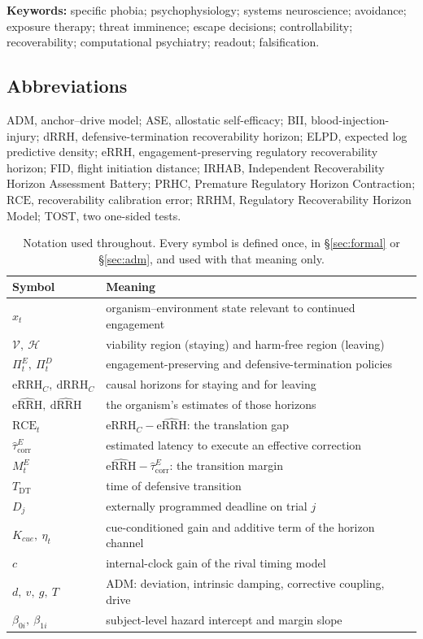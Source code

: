 \documentclass[9pt,twocolumn]{article}
\newcommand{\eRRH}{\mathrm{eRRH}}
\newcommand{\dRRH}{\mathrm{dRRH}}
\newcommand{\eRRHc}{\mathrm{eRRH}_{C}}
\newcommand{\dRRHc}{\mathrm{dRRH}_{C}}
\newcommand{\eRRHhat}{\widehat{\mathrm{eRRH}}}
\newcommand{\dRRHhat}{\widehat{\mathrm{dRRH}}}
\newcommand{\RCE}{\mathrm{RCE}}
\newcommand{\Tdt}{T_{\mathrm{DT}}}
\newcommand{\tcorr}{\widehat{\tau}^{E}_{\mathrm{corr}}}
\newcommand{\Vset}{\mathcal{V}}
\newcommand{\Hset}{\mathcal{H}}
\begin{document}
\noindent\textbf{Keywords:} specific phobia; psychophysiology; systems neuroscience; avoidance; exposure therapy; threat imminence; escape decisions; controllability; recoverability; computational psychiatry; readout; falsification.

\subsection*{Abbreviations}
\noindent\footnotesize
ADM, anchor--drive model; ASE, allostatic self-efficacy; BII, blood-injection-injury;
$\dRRH$, defensive-termination recoverability horizon; ELPD, expected log predictive
density; $\eRRH$, engagement-preserving regulatory recoverability horizon; FID, flight
initiation distance; IRHAB, Independent Recoverability Horizon Assessment Battery;
PRHC, Premature Regulatory Horizon Contraction; $\RCE$, recoverability calibration
error; RRHM, Regulatory Recoverability Horizon Model; TOST, two one-sided tests.
\normalsize

\begin{table}[!t]
\centering
\caption{Notation used throughout. Every symbol is defined once, in \S\ref{sec:formal} or \S\ref{sec:adm}, and used with that meaning only.}
\label{tab:notation}
\small
\begin{tabular}{@{}lp{}@{}}
\toprule
Symbol & Meaning \\
\midrule
$x_t$ & organism--environment state relevant to continued engagement \\
$\Vset,\ \Hset$ & viability region (staying) and harm-free region (leaving) \\
$\Pi^E_t,\ \Pi^D_t$ & engagement-preserving and defensive-termination policies \\
$\eRRHc,\ \dRRHc$ & causal horizons for staying and for leaving \\
$\eRRHhat,\ \dRRHhat$ & the organism's estimates of those horizons \\
$\RCE_t$ & $\eRRHc-\eRRHhat$: the translation gap \\
$\tcorr$ & estimated latency to execute an effective correction \\
$M^E_t$ & $\eRRHhat-\tcorr$: the transition margin \\
$\Tdt$ & time of defensive transition \\
$D_j$ & externally programmed deadline on trial $j$ \\
$K_{cue},\ \eta_t$ & cue-conditioned gain and additive term of the horizon channel \\
$c$ & internal-clock gain of the rival timing model \\
$d,\ v,\ g,\ T$ & ADM: deviation, intrinsic damping, corrective coupling, drive \\
$\beta_{0i},\ \beta_{1i}$ & subject-level hazard intercept and margin slope \\
\bottomrule
\end{tabular}
\end{table}
\end{document}
